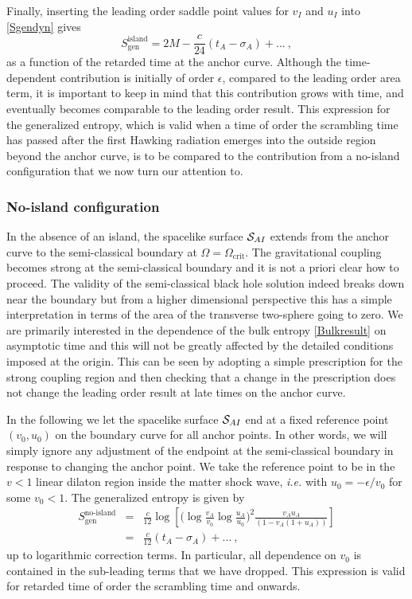 \documentclass[12pt,a4paper]{article}
\newcommand{\be}{\begin{equation}}
\newcommand{\ee}{\end{equation}}
\newcommand{\f}[2]{\frac{#1}{#2}}
\begin{document}
Finally, inserting the leading order saddle point values for $v_I$ and $u_I$ into \eqref{Sgendyn} gives
\be\label{islandresult}
S_\text{gen}^\text{island} = 2M - \f{c}{24}(t_A-\sigma_A)+\ldots \>,
\ee
as a function of the retarded time at the anchor curve. Although the time-dependent contribution is initially of order $\epsilon$, compared to the leading order area term, it is important to keep in mind that this contribution grows with time, and eventually becomes comparable to the leading order result. This expression for the generalized entropy, which is valid when a time of order the scrambling time has passed after the first Hawking radiation emerges into the outside region beyond the anchor curve, is to be compared to the contribution from a no-island configuration that we now turn our attention to. 

\subsubsection{No-island configuration}

In the absence of an island, the spacelike surface ${\cal S}_{AI}$ extends from the anchor curve to the semi-classical boundary at $\Omega=\Omega_\text{crit}$. The gravitational coupling becomes strong at the semi-classical boundary and it is not a priori clear how to proceed. The validity of the semi-classical black hole solution indeed breaks down near the boundary but from a higher dimensional perspective this has a simple interpretation in terms of the area of the transverse two-sphere going to zero. We are primarily interested in the dependence of the bulk entropy \eqref{Bulkresult} on asymptotic time and this will not be greatly affected by the detailed conditions imposed at the origin. 
This can be seen by adopting a simple prescription for the strong coupling region and then checking that a change in the prescription does not change the leading order result at late times on the anchor curve. 

In the following we let the spacelike surface ${\cal S}_{AI}$ end at a fixed reference point $(v_0,u_0)$ on the boundary curve for all anchor points. In other words, we will simply ignore any adjustment of the endpoint at the semi-classical boundary in response to changing the anchor point. We take the reference point to be in the $v<1$ linear dilaton region inside the matter shock wave, {\it i.e.} with $u_0=-\epsilon/v_0$ for some $v_0<1$. The generalized entropy is given by
\begin{eqnarray}
S_\text{gen}^\text{no-island} &=& \f{c}{12}\log\left[\Big(\log\f{v_A}{v_0}\log\f{u_A}{u_0}\Big)^2\f{ v_Au_A}{(1-v_A(1+u_A))}\right] \nonumber \\
&=& \f{c}{12}(t_A-\sigma_A)+\ldots  \>,
\label{noislandresult}
\end{eqnarray}
up to logarithmic correction terms. In particular, all dependence on $v_0$ is contained in the sub-leading terms that we have dropped.
This expression is valid for retarded time of order the scrambling time and onwards.
\end{document}

